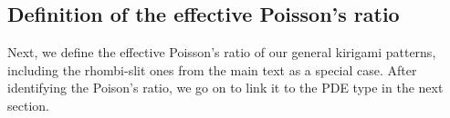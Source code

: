 \documentclass[aps,11pt,tightenlines,notitlepage,superscriptaddress,longbibliography,nofootinbib]{revtex4-1}
\newtheorem{definition}{Definition}[section]
\begin{document}

\subsection{Definition of the effective Poisson's ratio}
Next, we define the effective Poisson's ratio of our general kirigami patterns, including the rhombi-slit ones from the main text as a special case. After identifying the Poison's ratio, we go on to link it to the PDE type in the next section. 
\end{document}
